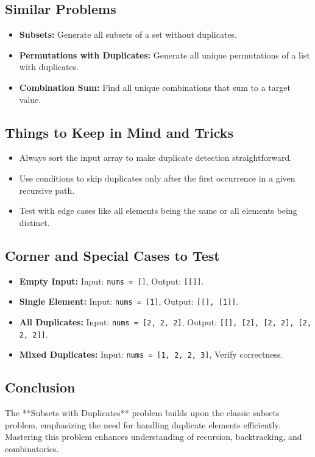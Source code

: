 \subsection*{Similar Problems}
\begin{itemize}
    \item \textbf{Subsets:} Generate all subsets of a set without duplicates.
    \item \textbf{Permutations with Duplicates:} Generate all unique permutations of a list with duplicates.
    \item \textbf{Combination Sum:} Find all unique combinations that sum to a target value.
\end{itemize}

\subsection*{Things to Keep in Mind and Tricks}
\begin{itemize}
    \item Always sort the input array to make duplicate detection straightforward.
    \item Use conditions to skip duplicates only after the first occurrence in a given recursive path.
    \item Test with edge cases like all elements being the same or all elements being distinct.
\end{itemize}

\subsection*{Corner and Special Cases to Test}
\begin{itemize}
    \item \textbf{Empty Input:} Input: \texttt{nums = []}, Output: \texttt{[[]]}.
    \item \textbf{Single Element:} Input: \texttt{nums = [1]}, Output: \texttt{[[], [1]]}.
    \item \textbf{All Duplicates:} Input: \texttt{nums = [2, 2, 2]}, Output: \texttt{[[], [2], [2, 2], [2, 2, 2]]}.
    \item \textbf{Mixed Duplicates:} Input: \texttt{nums = [1, 2, 2, 3]}, Verify correctness.
\end{itemize}

\subsection*{Conclusion}
The **Subsets with Duplicates** problem builds upon the classic subsets problem, emphasizing the need for handling duplicate elements efficiently. Mastering this problem enhances understanding of recursion, backtracking, and combinatorics.